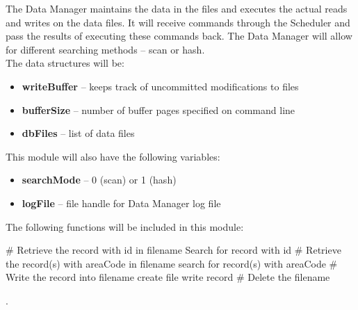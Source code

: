 The Data Manager maintains the data in the files and executes the actual reads and writes on the data files. It will receive commands through the Scheduler and pass the results of executing these commands back. The Data Manager will allow for different searching methods -- scan or hash. \\

The data structures will be:

\begin{itemize}
\item \textbf{writeBuffer} -- keeps track of uncommitted modifications to files
\item \textbf{bufferSize} -- number of buffer pages specified on command line
\item \textbf{dbFiles} -- list of data files
\end{itemize}

This module will also have the following variables:
\begin{itemize}
\item \textbf{searchMode} -- 0 (scan) or 1 (hash)
\item \textbf{logFile} -- file handle for Data Manager log file
\end{itemize}

The following functions will be included in this module:\\

\begin{algorithmic}
	\State  \# Retrieve the record with id in filename
		\EndIf
		\State  Search for record with id
		\EndIf	
	\EndFunction
	\State
	\State \# Retrieve the record(s) with areaCode in filename
		\EndIf
		\State  search for record(s) with areaCode
		\EndIf	
	\EndFunction
	\State
	\State \# Write the record into filename
			create file
		\EndIf
		\State write record
	\EndFunction
	\State
	\State \# Delete the filename
	\EndFunction

\end{algorithmic} .\\